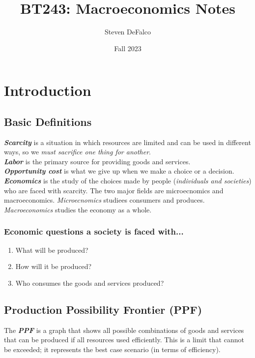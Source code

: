 \documentclass{article}
\title{BT243: Macroeconomics Notes}
\author{Steven DeFalco}
\date{Fall 2023}
\newcommand{\define}[1]{\textbf{\textit{#1}}}
\begin{document}
\maketitle
\tableofcontents
\newpage



\section{Introduction}

\subsection{Basic Definitions}

\define{Scarcity} is a situation in which resources are limited and can be used in different ways, so we \emph{must sacrifice one thing for another}. \\ 

\define{Labor} is the primary source for providing goods and services. \\

\define{Opportunity cost} is what we give up when we make a choice or a decision. \\

\define{Economics} is the study of the choices made by people (\emph{individuals and societies}) who are faced with scarcity. The two major fields are microecnomics and macroeconomics. \emph{Microecnomics} studiees consumers and produces. \emph{Macroeconomics} studies the economy as a whole. \\ 

\subsubsection{Economic questions a society is faced with...}

\begin{enumerate}
  \item What will be produced? 
  \item How will it be produced?
  \item Who consumes the goods and services produced?
\end{enumerate}

\subsection{Production Possibility Frontier (PPF)}

The \define{PPF} is a graph that shows all possible combinations of goods and services that can be produced if all resources used efficiently. This is a limit that cannot be exceeded; it represents the best case scenario (in terms of efficiency). 
\end{document}
